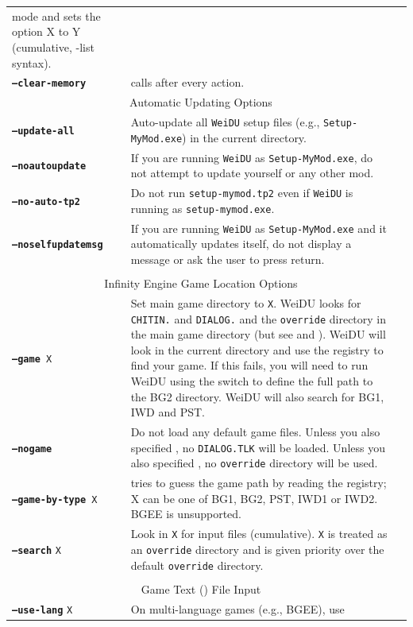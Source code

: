 \documentclass{article}
\def\ttref#1{\ahrefloc{#1}{\tt #1}}
\def\DEFINE#1{{\tt \bf #1}\label{#1}\index{#1}}
\def\t#1{{\tt #1}}
\begin{document}
\begin{tabular}{lp{10in}|p{10in}}
\ttref{MODDER} mode and sets the \ttref{MODDER} option X to Y (cumulative,
-list syntax).
\\
\DEFINE{--clear-memory} & calls \ttref{CLEAR_MEMORY} after every \ttref{TP2} action.
\\
\multicolumn{2}{c}{ \color{red} Automatic Updating Options } \\
\DEFINE{--update-all} & Auto-update all \t{WeiDU} setup files (e.g.,
\t{Setup-MyMod.exe}) in the current directory. \\
\DEFINE{--noautoupdate} & If you are running \t{WeiDU} as
\t{Setup-MyMod.exe}, do not attempt to update yourself or any other mod. \\
\DEFINE{--no-auto-tp2} & Do not run \t{setup-mymod.tp2} even if \t{WeiDU} is
running as \t{setup-mymod.exe}. \\
\DEFINE{--noselfupdatemsg} & If you are running \t{WeiDU} as
\t{Setup-MyMod.exe} and it automatically updates itself, do not display a
message or ask the user to press return. \\
\\
\multicolumn{2}{c}{ \color{red} Infinity Engine Game Location Options } \\
{\tt \DEFINE{--game} X	} & Set main game directory to {\tt X}. WeiDU looks for
{\tt CHITIN.}\ttref{KEY} and {\tt DIALOG.}\ttref{TLK} and the \t{override}
directory in the main game directory (but see \ttref{--tlkin} and
\ttref{--search}). WeiDU will look in the current directory and use the
registry to find your game. If this fails, you will need to run WeiDU using
the \ttref{--game} switch to define the full path to the BG2 directory.
WeiDU will also search for BG1, IWD and PST. \\
\DEFINE{--nogame}  & Do not
load any default game files. Unless you also specified \ttref{--tlkin}, no
\t{DIALOG.TLK} will be loaded. Unless you also specified \ttref{--search},
no \t{override} directory will be used. \\
{\tt \DEFINE{--game-by-type} X} & tries to guess the game path by reading
the registry; X can be one of BG1, BG2, PST, IWD1 or IWD2. BGEE is unsupported.
\\
\DEFINE{--search} \t{X}	& Look in {\tt X} for input files (cumulative).
\t{X} is treated as an \t{override} directory and is given priority over
the default \t{override} directory. \\
\\
\multicolumn{2}{c}{ \color{red} Game Text (\ttref{TLK}) File Input} \\
\DEFINE{--use-lang} \t{X} & On multi-language games (e.g., BGEE), use

\end{tabular}
\end{document}
